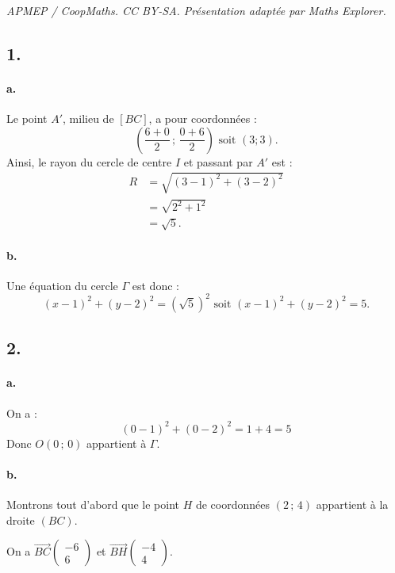 \documentclass[10pt]{article}
\begin{document}
\noindent\textit{APMEP / CoopMaths. CC BY-SA. Présentation adaptée par Maths Explorer.}\par\medskip
\subsection*{1.}

\paragraph{a.} Le point \( A' \), milieu de \([BC]\), a pour coordonnées :
\[
\left( \dfrac{6 + 0}{2} \,;\, \dfrac{0 + 6}{2} \right) \text{ soit } (3 ; 3).
\]
Ainsi, le rayon du cercle de centre \( I \) et passant par \( A' \) est :
\begin{align*}
R &= \sqrt{(3 - 1)^2 + (3 - 2)^2} \\
&= \sqrt{2^2 + 1^2} \\
&= \sqrt{5}.
\end{align*}

\paragraph{b.} Une équation du cercle \( \Gamma \) est donc :
\[
(x - 1)^2 + (y - 2)^2 = (\sqrt{5})^2 \text{ soit } (x - 1)^2 + (y - 2)^2 = 5.
\]

\subsection*{2.}

\paragraph{a.} On a : 
\[
(0 - 1)^2 + (0 - 2)^2 = 1 + 4 = 5
\]
Donc \( O(0\,;\,0) \) appartient à \( \Gamma \).

\paragraph{b.} Montrons tout d'abord que le point \( H \) de coordonnées \( (2\,;\,4) \) appartient à la droite \( (BC) \).  

On a \( \overrightarrow{BC} \begin{pmatrix} -6 \\ 6 \end{pmatrix} \) et \( \overrightarrow{BH} \begin{pmatrix} -4 \\ 4 \end{pmatrix} \).
\end{document}

